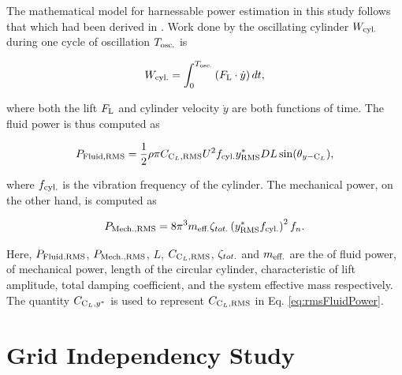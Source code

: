 \documentclass[oneside]{utmthesis}
\begin{document}
The mathematical model for harnessable power estimation in this study follows that which had been derived in \citet{Raghavan2007a}. Work done by the oscillating cylinder $W_{\text{cyl.}}$ during one cycle of oscillation $T_{\text{osc.}}$ is

\begin{equation}
  W_{\text{cyl.}} = \int_{0}^{T_{\text{osc.}}} \left ( F_{\text{L}} \cdot \dot{y} \right ) dt,
  \label{eq:workCylinder}
\end{equation}

\noindent where both the lift $F_{\text{L}}$ and cylinder velocity $\dot{y}$ are both functions of time. The fluid power is thus computed as

\begin{equation}
  P_{\text{Fluid,RMS}} = \frac{1}{2} \rho \pi C_{\text{C}_{L},\text{RMS}} U^{2} f_{\text{cyl.}} y^{*}_{\text{RMS}} D L \sin(\theta_{y-\text{C}_{L}}),
  \label{eq:rmsFluidPower}
\end{equation}

\noindent where $f_{\text{cyl.}}$ is the vibration frequency of the cylinder. The mechanical power, on the other hand, is computed as

\begin{equation}
  P_{\text{Mech.,RMS}} = 8 \pi^{3} m_{\text{eff.}} \zeta_{tot.} \left (y^{*}_{\text{RMS}} f_{\text{cyl.}} \right )^{2} f_{n}.
  \label{eq:rmsMechPower}
\end{equation}

Here, $P_{\text{Fluid,RMS}}$, $P_{\text{Mech.,RMS}}$, $L$, $C_{\text{C}_{L},\text{RMS}}$, $\zeta_{tot.}$ and $m_{\text{eff.}}$ are the \rms{} of fluid power, \rms{} of mechanical power, length of the circular cylinder, characteristic \rms{} of lift amplitude, total damping coefficient, and the system effective mass respectively. The quantity $C_{\text{C}_{L},y^{*}}$ is used to represent $C_{\text{C}_{L},\text{RMS}}$ in Eq. \ref{eq:rmsFluidPower}.


\section{Grid Independency Study} \label{sec:gridIndStu}
\end{document}

